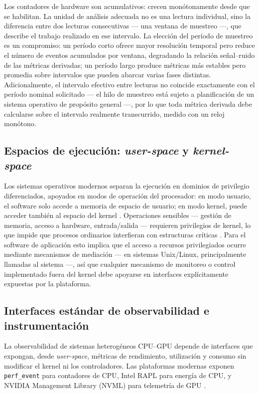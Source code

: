 \documentclass[12pt,oneside,spanish]{book}
\begin{document}
Los contadores de hardware son acumulativos: crecen monótonamente desde que se habilitan. La unidad de análisis adecuada no es una lectura individual, sino la diferencia entre dos lecturas consecutivas --- una ventana de muestreo ---, que describe el trabajo realizado en ese intervalo. La elección del período de muestreo es un compromiso: un período corto ofrece mayor resolución temporal pero reduce el número de eventos acumulados por ventana, degradando la relación señal--ruido de las métricas derivadas; un período largo produce métricas más estables pero promedia sobre intervalos que pueden abarcar varias fases distintas. Adicionalmente, el intervalo efectivo entre lecturas no coincide exactamente con el período nominal solicitado --- el hilo de muestreo está sujeto a planificación de un sistema operativo de propósito general ---, por lo que toda métrica derivada debe calcularse sobre el intervalo realmente transcurrido, medido con un reloj monótono.

\subsection{Espacios de ejecución: \textit{user-space} y \textit{kernel-space}}

Los sistemas operativos modernos separan la ejecución en dominios de privilegio diferenciados, apoyados en modos de operación del procesador: en modo usuario, el software solo accede a memoria de espacio de usuario; en modo kernel, puede acceder también al espacio del kernel \cite[ch.~2]{Kerrisk2010}. Operaciones sensibles --- gestión de memoria, acceso a hardware, entrada/salida --- requieren privilegios de kernel, lo que impide que procesos ordinarios interfieran con estructuras críticas \cite[ch.~2]{Kerrisk2010}. Para el software de aplicación esto implica que el acceso a recursos privilegiados ocurre mediante mecanismos de mediación --- en sistemas Unix/Linux, principalmente llamadas al sistema \cite{McCarty2015} ---, así que cualquier mecanismo de monitoreo o control implementado fuera del kernel debe apoyarse en interfaces explícitamente expuestas por la plataforma.

\subsection{Interfaces estándar de observabilidad e instrumentación}

La observabilidad de sistemas heterogéneos CPU--GPU depende de interfaces que expongan, desde \textit{user-space}, métricas de rendimiento, utilización y consumo sin modificar el kernel ni los controladores. Las plataformas modernas exponen \texttt{perf\_event} para contadores de CPU, Intel RAPL para energía de CPU, y NVIDIA Management Library (NVML) para telemetría de GPU \cite{Calore2017,Weaver2015,David2010,NVML2026}.
\end{document}
